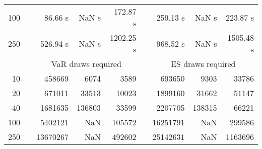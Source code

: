 {{\begin{longtable}{rr rrr r rrr}
100 & & 86.66 s &  NaN s & 172.87 s && 259.13 s &  NaN s & 223.87 s \\ 
250 & & 526.94 s &  NaN s & 1202.25 s && 968.52 s &  NaN s & 1505.48 s \\ 
\hline 
 && \multicolumn{3}{c}{VaR draws required} &&   \multicolumn{3}{c}{ES draws required} \\  \cline{3-5}  \cline{7-9} 
10 & & 458669 & 6074 & 3589 && 693650 & 9303 & 33786 \\ 
20 & & 671011 & 33513 & 10023 && 1899160 & 31662 & 51147 \\ 
40 & & 1681635 & 136803 & 33599 && 2207705 & 138315 & 66221 \\ 
100 & & 5402121 & NaN & 105572 && 16251791 & NaN & 299586 \\ 
250 & & 13670267 & NaN & 492602 && 25142631 & NaN & 1163696 \\ 
\hline 
\end{longtable} 
} 
} 
